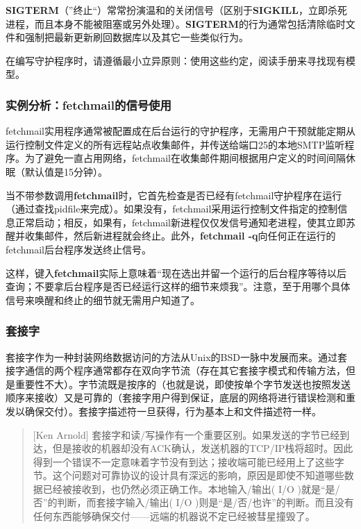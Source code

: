 \documentclass[12pt,oneside]{book}
\begin{document}
\begin{common-format}
\textbf{SIGTERM}（”终止“）常常扮演温和的关闭信号（区别于\textbf{SIGKILL}，立即杀死进程，而且本身不能被阻塞或另外处理）。\textbf{SIGTERM}的行为通常包括清除临时文件和强制把最新更新刷回数据库以及其它一些类似行为。

在编写守护程序时，请遵循最小立异原则：使用这些约定，阅读手册来寻找现有模型。


\subsubsection{实例分析：fetchmail的信号使用}
fetchmail实用程序通常被配置成在后台运行的守护程序，无需用户干预就能定期从运行控制文件定义的所有远程站点收集邮件，并传送给端口25的本地SMTP监听程序。为了避免一直占用网络，fetchmail在收集邮件期间根据用户定义的时间间隔休眠（默认值是15分钟）。

当不带参数调用\textbf{fetchmail}时，它首先检查是否已经有fetchmail守护程序在运行（通过查找pidfile来完成）。如果没有，fetchmail采用运行控制文件指定的控制信息正常启动；相反，如果有，fetchmail新进程仅仅发信号通知老进程，使其立即苏醒并收集邮件，然后新进程就会终止。此外，\textbf{fetchmail -q}向任何正在运行的fetchmail后台程序发送终止信号。

这样，键入\textbf{fetchmail}实际上意味着“现在选出并留一个运行的后台程序等待以后查询；不要拿后台程序是否已经运行这样的细节来烦我”。注意，至于用哪个具体信号来唤醒和终止的细节就无需用户知道了。


\subsubsection{套接字}
套接字作为一种封装网络数据访问的方法从Unix的BSD一脉中发展而来。通过套接字通信的两个程序通常都存在双向字节流（存在其它套接字模式和传输方法，但是重要性不大）。字节流既是按序的（也就是说，即使按单个字节发送也按照发送顺序来接收）又是可靠的（套接字用户得到保证，底层的网络将进行错误检测和重发以确保交付）。套接字描述符一旦获得，行为基本上和文件描述符一样。

\begin{quote}[Ken Arnold]
套接字和读/写操作有一个重要区别。如果发送的字节已经到达，但是接收的机器却没有ACK确认，发送机器的TCP/IP栈将超时。因此得到一个错误不一定意味着字节没有到达；接收端可能已经用上了这些字节。这个问题对可靠协议的设计具有深远的影响，原因是即使不知道哪些数据已经被接收到，也仍然必须正确工作。本地输入/输出( I/O )就是“是/否”的判断，而套接字输入/输出( I/O )则是“是/否/也许”的判断。而且没有任何东西能够确保交付——远端的机器说不定已经被彗星撞毁了。
\end{quote}


\end{common-format}
\end{document}
